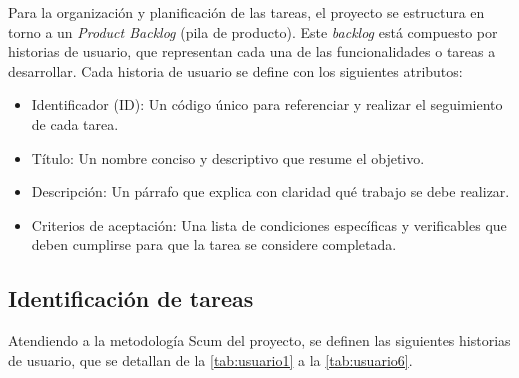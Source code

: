 \documentclass[12pt,a4paper,onecolumn,oneside]{report}
\begin{document}
Para la organización y planificación de las tareas, el proyecto se estructura en torno a un \textit{Product Backlog} (pila de producto). Este \textit{backlog} está 
compuesto por historias de usuario, que representan cada una de las funcionalidades o tareas a desarrollar. Cada historia de usuario se define con los siguientes atributos:

\begin{itemize}
  \item Identificador (ID): Un código único para referenciar y realizar el seguimiento de cada tarea.
  \item Título: Un nombre conciso y descriptivo que resume el objetivo.
  \item Descripción: Un párrafo que explica con claridad qué trabajo se debe realizar.
  \item Criterios de aceptación: Una lista de condiciones específicas y verificables que deben cumplirse para que la tarea se considere completada.
\end{itemize}

\subsection{Identificación de tareas}
\label{Identificación de tareas}

Atendiendo a la metodología Scum del proyecto, se definen las siguientes historias de usuario, que se detallan de la \autoref{tab:usuario1} a la \autoref{tab:usuario6}.


\begin{table}[H]
\centering
{}
\caption{Historia de usuario 1 (Planificación, configuración e investigación)}
\label{tab:usuario1}
\end{table}
\end{document}
